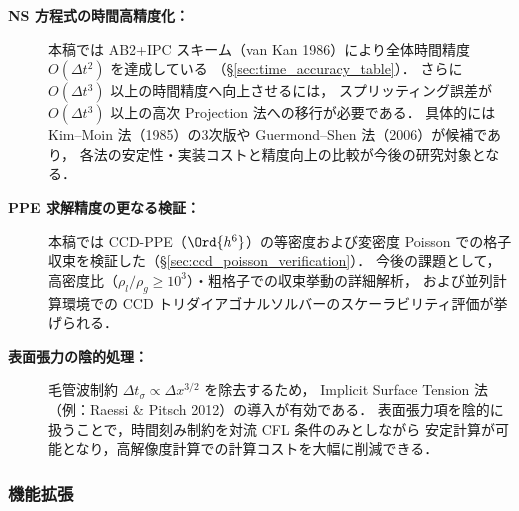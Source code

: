 \begin{description}
  \item[\textbf{NS 方程式の時間高精度化：}]
        本稿では AB2+IPC スキーム（van Kan 1986）により全体時間精度 $O(\Delta t^2)$ を達成している
        （§\ref{sec:time_accuracy_table}）．
        さらに $O(\Delta t^3)$ 以上の時間精度へ向上させるには，
        スプリッティング誤差が $O(\Delta t^3)$ 以上の高次 Projection 法への移行が必要である．
        具体的には Kim--Moin 法（1985）の3次版や Guermond--Shen 法（2006）が候補であり，
        各法の安定性・実装コストと精度向上の比較が今後の研究対象となる．

  \item[\textbf{PPE 求解精度の更なる検証：}]
        本稿では CCD-PPE（$\Ord{h^6}$）の等密度および変密度 Poisson での格子収束を検証した（§\ref{sec:ccd_poisson_verification}）．
        今後の課題として，高密度比（$\rho_l/\rho_g \geq 10^3$）・粗格子での収束挙動の詳細解析，
        および並列計算環境での CCD トリダイアゴナルソルバーのスケーラビリティ評価が挙げられる．

  \item[\textbf{表面張力の陰的処理：}]
        毛管波制約 $\Delta t_\sigma \propto \Delta x^{3/2}$ を除去するため，
        Implicit Surface Tension 法（例：Raessi \& Pitsch 2012）の導入が有効である．
        表面張力項を陰的に扱うことで，時間刻み制約を対流 CFL 条件のみとしながら
        安定計算が可能となり，高解像度計算での計算コストを大幅に削減できる．
\end{description}

\subsubsection{機能拡張}

